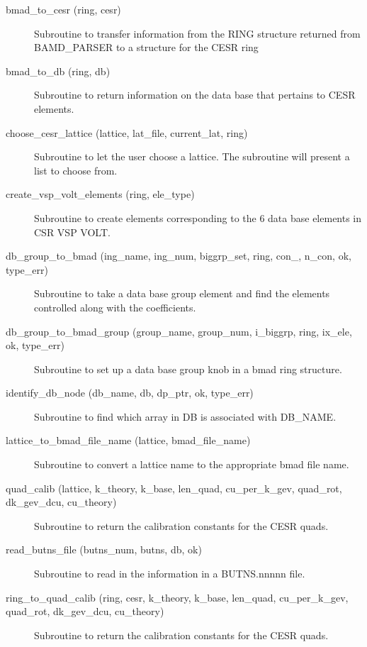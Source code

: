 \begin{description}

\item[bmad\_to\_cesr (ring, cesr)] \Newline
Subroutine to transfer information from the RING structure returned from BAMD\_PARSER to a structure for the CESR ring 

\item[bmad\_to\_db (ring, db)] \Newline
Subroutine to return information on the data base that pertains to CESR elements. 

\item[choose\_cesr\_lattice (lattice, lat\_file, current\_lat, ring)] \Newline
Subroutine to let the user choose a lattice. The subroutine will present a list to choose from. 

\item[create\_vsp\_volt\_elements (ring, ele\_type)] \Newline
Subroutine to create elements corresponding to the 6 data base elements in CSR VSP VOLT. 

\item[db\_group\_to\_bmad (ing\_name, ing\_num, biggrp\_set, ring, con\_, n\_con, ok, type\_err)] \Newline
Subroutine to take a data base group element and find the elements controlled along with the coefficients. 

\item[db\_group\_to\_bmad\_group (group\_name, group\_num, i\_biggrp, ring, ix\_ele, ok, type\_err)] \Newline
Subroutine to set up a data base group knob in a bmad ring structure. 

\item[identify\_db\_node (db\_name, db, dp\_ptr, ok, type\_err)] \Newline
Subroutine to find which array in DB is associated with DB\_NAME. 

\item[lattice\_to\_bmad\_file\_name (lattice, bmad\_file\_name)] \Newline
Subroutine to convert a lattice name to the appropriate bmad file name. 

\item[quad\_calib (lattice, k\_theory, k\_base, len\_quad, cu\_per\_k\_gev, quad\_rot, dk\_gev\_dcu, cu\_theory)] \Newline
Subroutine to return the calibration constants for the CESR quads. 

\item[read\_butns\_file (butns\_num, butns, db, ok)] \Newline
Subroutine to read in the information in a BUTNS.nnnnn file. 

\item[ring\_to\_quad\_calib (ring, cesr, k\_theory, k\_base, len\_quad, cu\_per\_k\_gev, \\
             \hskip3.0in quad\_rot, dk\_gev\_dcu, cu\_theory)] \Newline
Subroutine to return the calibration constants for the CESR quads. 

\end{description}


